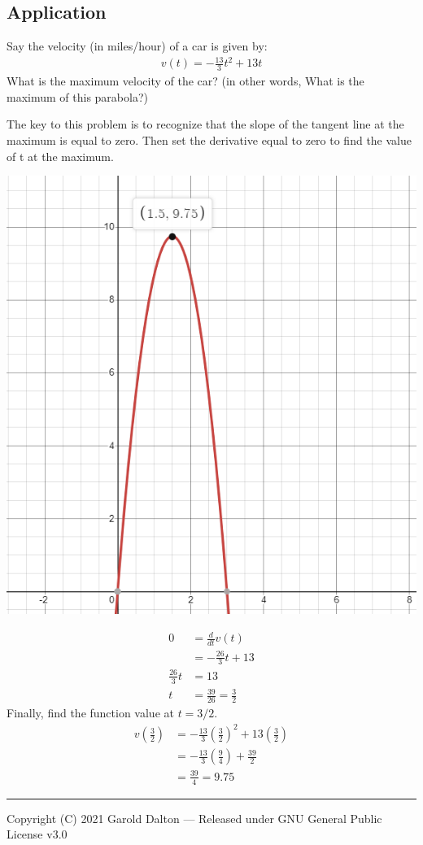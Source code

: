 \documentclass[14pt]{extarticle}
\begin{document}
\subsection{Application}
Say the velocity (in miles/hour) of a car is given by:
\begin{align*}
	v(t)=-\frac{13}{3}t^2 + 13t
\end{align*}
What is the maximum velocity of the car? (in other words, What is the maximum of this parabola?)

The key to this problem is to recognize that the slope of the tangent line at the maximum is equal to zero. Then set the derivative equal to zero to find the value of t at the maximum.
\begin{center}
	\includegraphics[width=0.6\linewidth]{9-5-20a}
\end{center}

\begin{align*}
	0 &= \frac{d}{dt}v(t) \\
	&=-\frac{26}{3}t + 13 \\
	\frac{26}{3}t &= 13 \\
	t &= \frac{39}{26} = \frac{3}{2}
\end{align*}
Finally, find the function value at $t = 3/2$.
\begin{align*}
	v\left(\frac{3}{2}\right) &= -\frac{13}{3}\left(\frac{3}{2}\right)^2 + 13\left(\frac{3}{2}\right) \\
	&= -\frac{13}{3}\left(\frac{9}{4}\right) + \frac{39}{2} \\
	& = \frac{39}{4} = 9.75
\end{align*}

\noindent\rule{\textwidth}{1pt}
{\footnotesize Copyright (C) 2021 Garold Dalton --- Released under GNU General Public License v3.0}


\cleardoublepage
\end{document}
